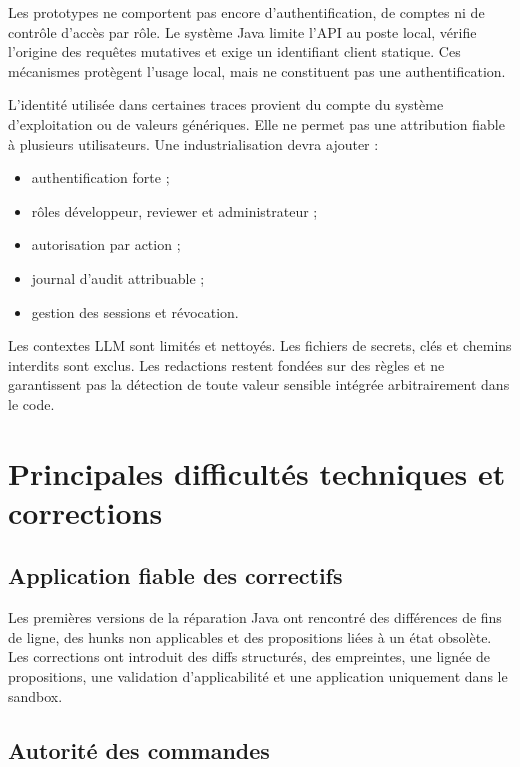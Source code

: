 Les prototypes ne comportent pas encore d'authentification, de comptes ni de contrôle d'accès par rôle. Le système Java limite l'API au poste local, vérifie l'origine des requêtes mutatives et exige un identifiant client statique. Ces mécanismes protègent l'usage local, mais ne constituent pas une authentification.

L'identité utilisée dans certaines traces provient du compte du système d'exploitation ou de valeurs génériques. Elle ne permet pas une attribution fiable à plusieurs utilisateurs. Une industrialisation devra ajouter :

\begin{itemize}
    \item authentification forte ;
    \item rôles développeur, reviewer et administrateur ;
    \item autorisation par action ;
    \item journal d'audit attribuable ;
    \item gestion des sessions et révocation.
\end{itemize}

Les contextes LLM sont limités et nettoyés. Les fichiers de secrets, clés et chemins interdits sont exclus. Les redactions restent fondées sur des règles et ne garantissent pas la détection de toute valeur sensible intégrée arbitrairement dans le code.

\section{Principales difficultés techniques et corrections}

\subsection{Application fiable des correctifs}

Les premières versions de la réparation Java ont rencontré des différences de fins de ligne, des hunks non applicables et des propositions liées à un état obsolète. Les corrections ont introduit des diffs structurés, des empreintes, une lignée de propositions, une validation d'applicabilité et une application uniquement dans le sandbox.

\subsection{Autorité des commandes}

